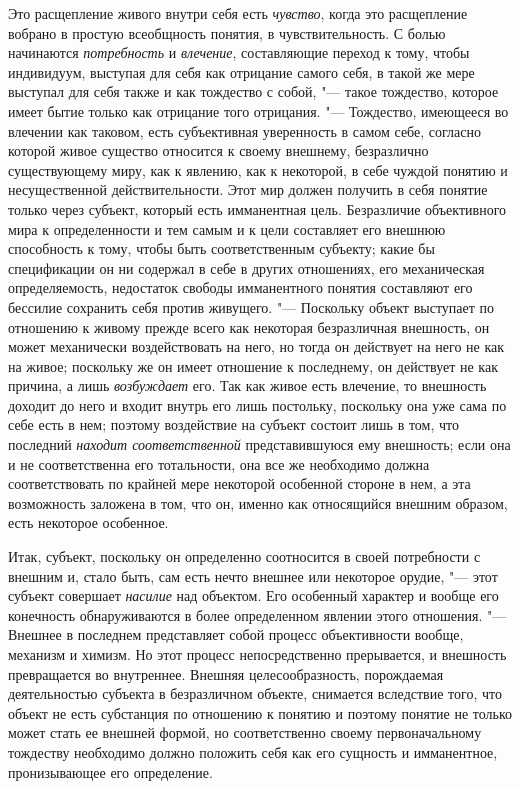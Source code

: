 {{Это расщепление живого внутри себя есть
{\em чувство}, когда это
расщепление вобрано в простую всеобщность понятия, в чувствительность. С
болью начинаются {\em потребность}
и {\em влечение},
составляющие переход к тому, чтобы индивидуум, выступая для
себя как отрицание самого себя, в такой же мере выступал для себя также и
как тождество с собой, "--- такое тождество, которое имеет
бытие только как отрицание того отрицания. "--- Тождество,
имеющееся во влечении как таковом, есть субъективная уверенность в самом
себе, согласно которой живое существо относится к своему внешнему,
безразлично существующему миру, как к явлению, как к некоторой, в себе
чуждой понятию и несущественной действительности. Этот мир
должен получить в себя понятие только через субъект, который
есть имманентная цель. Безразличие объективного мира к определенности и тем
самым и к цели составляет его внешнюю способность к тому, чтобы быть
соответственным субъекту; какие бы спецификации он ни содержал в себе в
других отношениях, его механическая определяемость, недостаток свободы
имманентного понятия составляют его бессилие сохранить себя против
живущего. "--- Поскольку объект выступает по отношению к живому
прежде всего как некоторая безразличная внешность, он может механически
воздействовать на него, но тогда он действует на него не как на живое;
поскольку же он имеет отношение к последнему, он действует не как причина,
а лишь {\em возбуждает}
его. Так как живое есть влечение, то внешность доходит до
него и входит внутрь его лишь постольку, поскольку она уже сама по себе
есть в нем; поэтому воздействие на субъект состоит лишь в том, что
последний {\em находит соответственной}
представившуюся ему внешность; если она и не соответственна
его тотальности, она все же необходимо должна соответствовать по крайней
мере некоторой особенной стороне в нем, а эта возможность заложена в том,
что он, именно как относящийся внешним образом, есть некоторое особенное.

Итак, субъект, поскольку он определенно соотносится в своей
потребности с внешним и, стало быть, сам есть нечто внешнее или некоторое
орудие, "--- этот субъект совершает
{\em насилие} над
объектом. Его особенный характер и вообще его конечность обнаруживаются в
более определенном явлении этого отношения. "--- Внешнее в
последнем представляет собой процесс объективности вообще, механизм и
химизм. Но этот процесс непосредственно прерывается, и внешность
превращается во внутреннее. Внешняя целесообразность, порождаемая
деятельностью субъекта в безразличном объекте, снимается вследствие того,
что объект не есть субстанция по отношению к понятию и поэтому понятие не
только может стать ее внешней формой, но соответственно своему
первоначальному тождеству необходимо должно положить себя как его сущность
и имманентное, пронизывающее его определение.

}}
